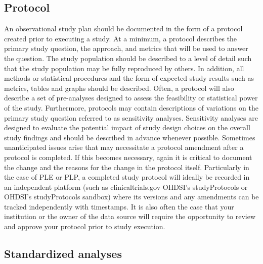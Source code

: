 \documentclass[11pt]{book}
\theoremstyle{definition}
\theoremstyle{definition}
\theoremstyle{definition}
\theoremstyle{remark}
\begin{document}
\hypertarget{protocol}{%
\subsection{Protocol}\label{protocol}}

An observational study plan should be documented in the form of a protocol created prior to executing a study. At a minimum, a protocol describes the primary study question, the approach, and metrics that will be used to answer the question. The study population should be described to a level of detail such that the study population may be fully reproduced by others. In addition, all methods or statistical procedures and the form of expected study results such as metrics, tables and graphs should be described.
Often, a protocol will also describe a set of pre-analyses designed to assess the feasibility or statistical power of the study. Furthermore, protocols may contain descriptions of variations on the primary study question referred to as sensitivity analyses. Sensitivity analyses are designed to evaluate the potential impact of study design choices on the overall study findings and should be described in advance whenever possible. Sometimes unanticipated issues arise that may necessitate a protocol amendment after a protocol is completed. If this becomes necessary, again it is critical to document the change and the reasons for the change in the protocol itself. Particularly in the case of PLE or PLP, a completed study protocol will ideally be recorded in an independent platform (such as clinicaltrials.gov OHDSI's studyProtocols or OHDSI's studyProtocols sandbox) where its versions and any amendments can be tracked independently with timestamps. It is also often the case that your institution or the owner of the data source will require the opportunity to review and approve your protocol prior to study execution.

\hypertarget{standardized-analyses}{%
\subsection{Standardized analyses}\label{standardized-analyses}}
\end{document}

